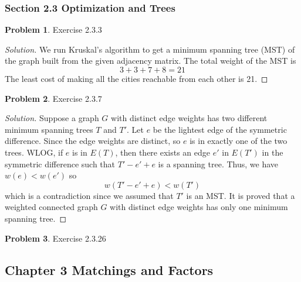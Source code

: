 \documentclass[12pt]{article}
\theoremstyle{definition}
\newtheorem{problem}{Problem}
\newenvironment*{solution}{\begin{proof}[Solution]}{\end{proof}}
\begin{document}
\subsubsection*{Section 2.3 Optimization and Trees}
\begin{problem}
    Exercise 2.3.3
\end{problem}
\begin{solution}
    We run Kruskal's algorithm to get a minimum spanning tree (MST) of the
    graph built from the given adjacency matrix. The total weight of the MST
    is \[3+3+7+8=21\] The least cost of making all the cities reachable from
    each other is 21.
\end{solution}
\begin{problem}
    Exercise 2.3.7
\end{problem}
\begin{solution}
    Suppose a graph \(G\) with distinct edge weights has two different minimum
    spanning trees \(T\) and \(T'\). Let \(e\) be the lightest edge of the
    symmetric difference. Since the edge weights are distinct, so \(e\) is in
    exactly one of the two trees. WLOG, if \(e\) is in \(E(T)\), then there
    exists an edge \(e'\) in \(E(T')\) in the symmetric difference such that
    \(T'-e'+e\) is a spanning tree. Thus, we have \(w(e) < w(e')\) so
    \[w(T'-e'+e) < w(T')\] which is a contradiction since we assumed that
    \(T'\) is an MST. It is proved that a weighted connected graph \(G\) with
    distinct edge weights has only one minimum spanning tree.
\end{solution}
\begin{problem}
    Exercise 2.3.26
\end{problem}

\subsection*{Chapter 3 Matchings and Factors}
\end{document}
